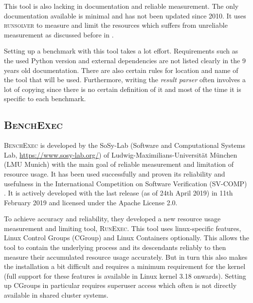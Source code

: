 This tool is also lacking in documentation and reliable measurement.
The only documentation available is minimal and has not been updated since 2010.
It uses \textsc{runsolver} to measure and limit the resources which suffers from unreliable measurement as discussed before in .

Setting up a benchmark with this tool takes a lot effort.
Requirements such as the used Python version and external dependencies are not listed clearly in the 9 years old documentation.
There are also certain rules for location and name of the tool that will be used.
Furthermore, writing the \textit{result parser} often involves a lot of copying since there is no certain definition of it and most of the time it is specific to each benchmark.

\subsection{\textsc{BenchExec}}
\label{sec:benchmarking.impl.benchexec}

\textsc{BenchExec} \citep{philipp_wendler_2019_2561835} is developed by the SoSy-Lab (Software and Computational Systems Lab, \url{https://www.sosy-lab.org/}) of Ludwig-Maximilians-Universit\"at München (LMU Munich) with the main goal of reliable measurement and limitation of resource usage.
It has been used successfully and proven its reliability and usefulness in the International Competition on Software Verification (SV-COMP) \citep{beyerReliableBenchmarkingRequirements2019}.
It is actively developed with the last release (as of 24th April 2019) in 11th February 2019 and licensed under the Apache License 2.0.

To achieve accuracy and reliability, they developed a new resource usage measurement and limiting tool, \textsc{RunExec}.
This tool uses linux-specific features, Linux Control Groups (CGroup) and Linux Containers optionally.
This allows the tool to contain the underlying process and its descendants reliably to then measure their accumulated resource usage accurately.
But in turn this also makes the installation a bit difficult and requires a minimum requirement for the kernel (full support for these features is available in Linux kernel 3.18 onwards).
Setting up CGroups in particular requires superuser access which often is not directly available in shared cluster systems.


